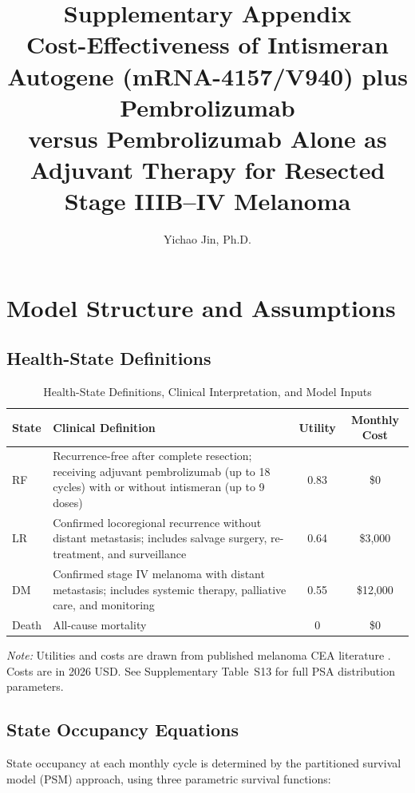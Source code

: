 \documentclass[11pt,a4paper]{article}
\title{Supplementary Appendix\\
\large Cost-Effectiveness of Intismeran Autogene (mRNA-4157/V940) plus Pembrolizumab\\
versus Pembrolizumab Alone as Adjuvant Therapy for Resected Stage IIIB--IV Melanoma}
\author{Yichao Jin, Ph.D.}
\date{}
\begin{document}
\maketitle
\tableofcontents
\newpage

\section{Model Structure and Assumptions}

\subsection{Health-State Definitions}
\label{sec:s1}
\begin{table}[H]
\centering
\caption{Health-State Definitions, Clinical Interpretation, and Model Inputs}
\label{tab:s1}
\begin{tabular}{lp{5cm}cc}
\toprule
\textbf{State} & \textbf{Clinical Definition} & \textbf{Utility} & \textbf{Monthly Cost} \\
\midrule
RF & Recurrence-free after complete resection; receiving adjuvant pembrolizumab (up to 18 cycles) with or without intismeran (up to 9 doses) & 0.83 & \$0 \\
LR & Confirmed locoregional recurrence without distant metastasis; includes salvage surgery, re-treatment, and surveillance & 0.64 & \$3,000 \\
DM & Confirmed stage IV melanoma with distant metastasis; includes systemic therapy, palliative care, and monitoring & 0.55 & \$12,000 \\
Death & All-cause mortality & 0 & \$0 \\
\bottomrule
\end{tabular}
\end{table}
\noindent\textit{Note:} Utilities and costs are drawn from published melanoma CEA literature \cite{bensimon2019, johnston2021, zhang2023}. Costs are in 2026 USD. See Supplementary Table~S13 for full PSA distribution parameters.

\subsection{State Occupancy Equations}
\label{sec:s2}
State occupancy at each monthly cycle is determined by the partitioned survival model (PSM) approach, using three parametric survival functions:
\end{document}
